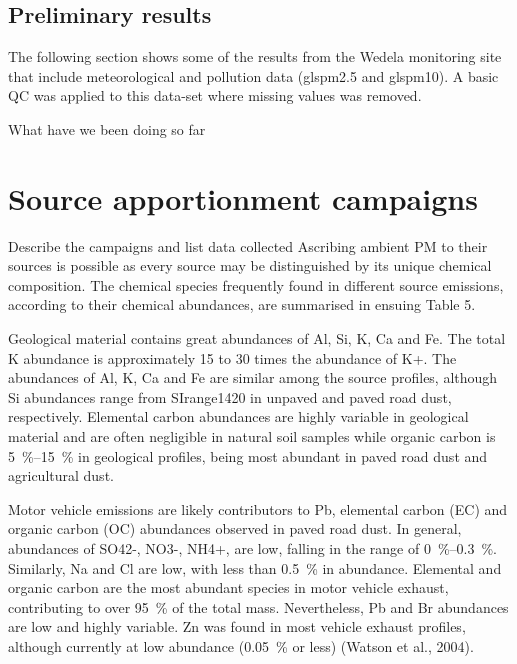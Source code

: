 \documentclass{nwureport}
\begin{document}
\section{Preliminary results}

The following section shows some of the results from the Wedela monitoring site that include meteorological
and pollution data (gls{pm2.5} and gls{pm10}). A basic QC was applied to this data-set where missing values was removed.




What have we been doing so far


\chapter{Source apportionment campaigns}
\label{sec:source}

Describe the campaigns and list data collected
Ascribing ambient PM to their sources is possible as every source may be distinguished by its unique chemical composition. The chemical species frequently found in different source emissions, according to their chemical abundances, are summarised in ensuing Table 5. 

Geological material contains great abundances of Al, Si, K, Ca and Fe. The total K abundance is approximately \num{15} to \num{30} times the abundance of K+. The abundances of Al, K, Ca and Fe are similar among the source profiles, although Si abundances range from SIrange{14}{20}{\percent} in unpaved and paved road dust, respectively. Elemental carbon abundances are highly variable in geological material and are often negligible in natural soil samples while organic carbon is \SIrange{5}{15}{\percent} in geological profiles, being most abundant in paved road dust and agricultural dust. 

Motor vehicle emissions are likely contributors to Pb, elemental carbon (EC) and organic carbon (OC) abundances observed in paved road dust. In general, abundances of SO42-, NO3-, NH4+, are low, falling in the range of \SIrange{0}{0.3}{\percent}. Similarly, Na and Cl are low, with less than \SI{0.5}{\percent} in abundance. Elemental and organic carbon are the most abundant species in motor vehicle exhaust, contributing to over \SI{95}{\percent} of the total mass. Nevertheless, Pb and Br abundances are low and highly variable. Zn was found in most vehicle exhaust profiles, although currently at low abundance (\SI{0.05}{\percent} or less) (Watson et al., 2004).
\end{document}
